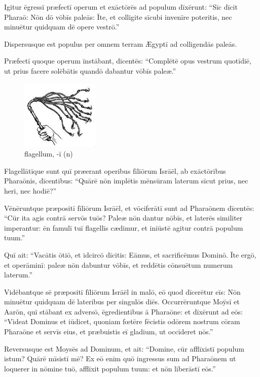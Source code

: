 Igitur ēgressī præfectī
operum et exāctōrēs ad populum dīxērunt: ``Sīc dīcit
Pharaō: Nōn dō vōbīs paleās:  Īte, et
colligite sīcubi invenīre poteritis, nec
minuētur quidquam dē opere vestrō.''

Dispersusque est
populus per omnem terram Ægyptī ad colligendās
paleās.

Præfectī quoque operum
īnstābant, dīcentēs: ``Complētē opus vestrum
quotīdiē, ut prius facere solēbātis quandō dabantur vōbīs
paleæ.''  

\begin{figure}[H]
    \begin{minipage}[]{1.0\linewidth}
        \centering
        \includegraphics{flagellum}
        \caption{flagellum, -ī (n)}
    \end{minipage}%
\end{figure}

Flagellātīque sunt quī præerant
operibus fīliōrum Isrāēl, ab exāctōribus
Pharaōnis, dīcentibus: ``Quārē nōn implētis mēnsūram
laterum sīcut prius, nec heri, nec hodiē?''

Vēnēruntque præpositī
fīliōrum Isrāēl, et vōciferātī sunt ad Pharaōnem dīcentēs: ``Cūr ita
agis contrā servōs tuōs?  Paleæ nōn dantur nōbīs, et
laterēs similiter imperantur:
ēn
famulī
tuī flagellīs cædimur, et iniūstē agitur contrā populum
tuum.''

Quī ait: ``Vacātis ōtiō, et
idcircō dīcitis: Eāmus, et
sacrificēmus Dominō.  Īte ergō, et operāminī:
paleæ nōn dabuntur vōbīs, et reddētis
cōnsuētum numerum laterum.''

Vidēbantque sē præpositī
fīliōrum Isrāēl in malō, eō quod dīcerētur eīs: Nōn
minuētur quidquam dē lateribus per singulōs diēs.  Occurrēruntque Moȳsī
et Aarōn, quī stābant ex adversō, ēgredientibus ā Pharaōne:
et dīxērunt ad eōs: ``Videat Dominus et iūdicet,
quoniam fœtēre fēcistis odōrem nostrum cōram
Pharaōne et servīs eius, et præbuistis eī
gladium, ut occīderet nōs.''

Reversusque est Moysēs ad
Dominum, et ait: ``Domine, cūr afflīxistī populum
is\-tum? Quārē mīsistī mē?  Ex eō enim quō ingressus sum ad Pharaōnem ut loquerer in nōmine tuō,
afflīxit populum tuum: et nōn līberāstī eōs.''

